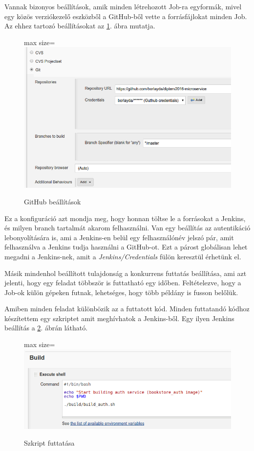 \documentclass[11pt,magyar,a4paper,twoside,]{report}
\let\Oldincludegraphics\includegraphics
\renewcommand{\includegraphics}[1]{
\begin{adjustbox}{max size={\textwidth}{\textheight}}
    \Oldincludegraphics[scale=0.6]{#1}%
\end{adjustbox}
}
\begin{document}
Vannak bizonyos beállítások, amik minden létrehozott Job-ra egyformák,
mivel egy közös verziókezelő eszközből a GitHub-ből vette a
forrásfájlokat minden Job. Az ehhez tartozó beállításokat az
\ref{github-conf}. ábra mutatja.

\begin{figure}[H]
\centering
\includegraphics{img/github-config.png}
\caption{GitHub beállítások\label{github-conf}}
\end{figure}

Ez a konfiguráció azt mondja meg, hogy honnan töltse le a forrásokat a
Jenkins, és milyen branch tartalmát akarom felhasználni. Van egy
beállítás az autentikáció lebonyolítására is, ami a Jenkins-en belül egy
felhasználónév jelszó pár, amit felhasználva a Jenkins tudja használni a
GitHub-ot. Ezt a párost globálisan lehet megadni a Jenkins-nek, amit a
\emph{Jenkins/Credentials} fülön keresztül érhetünk el.

Másik mindenhol beállított tulajdonság a konkurrens futtatás beállítása,
ami azt jelenti, hogy egy feladat többször is futtatható egy időben.
Feltételezve, hogy a Job-ok külön gépeken futnak, lehetséges, hogy több
példány is fusson belőlük.

Amiben minden feladat különbözik az a futtatott kód. Minden futtatandó
kódhoz készítettem egy szkriptet amit meghívhatok a Jenkins-ből. Egy
ilyen Jenkins beállítás a \ref{script-run}. ábrán látható.

\begin{figure}[H]
\centering
\includegraphics{img/script-run.png}
\caption{Szkript futtatása\label{script-run}}
\end{figure}
\end{document}
